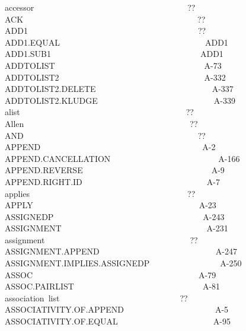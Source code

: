 \documentclass[11pt]{book}
\newenvironment{pubasis}{\begin{flushleft}\ttfamily\small}{\normalsize\rmfamily\end{flushleft}}
\begin{document}
\begin{pubasis}
accessor~~~~~~~~~~~~~~~~~~~~~~~~~~~~~~~~~~~~~??\\
ACK~~~~~~~~~~~~~~~~~~~~~~~~~~~~~~~~~~~~~~~~~~??\\
ADD1~~~~~~~~~~~~~~~~~~~~~~~~~~~~~~~~~~~~~~~~~??\\
ADD1.EQUAL~~~~~~~~~~~~~~~~~~~~~~~~~~~~~~~~~~~ADD1\\
ADD1.SUB1~~~~~~~~~~~~~~~~~~~~~~~~~~~~~~~~~~~~ADD1\\
ADDTOLIST~~~~~~~~~~~~~~~~~~~~~~~~~~~~~~~~~~~~A-73\\
ADDTOLIST2~~~~~~~~~~~~~~~~~~~~~~~~~~~~~~~~~~~A-332\\
ADD\-TO\-LIST2.DELETE~~~~~~~~~~~~~~~~~~~~~~~~~~~~A-337\\
ADD\-TO\-LIST2.KLUDGE~~~~~~~~~~~~~~~~~~~~~~~~~~~~A-339\\
alist~~~~~~~~~~~~~~~~~~~~~~~~~~~~~~~~~~~~~~~~??\\
Allen~~~~~~~~~~~~~~~~~~~~~~~~~~~~~~~~~~~~~~~~??\\
AND~~~~~~~~~~~~~~~~~~~~~~~~~~~~~~~~~~~~~~~~~~??\\
APPEND~~~~~~~~~~~~~~~~~~~~~~~~~~~~~~~~~~~~~~~A-2\\
APPEND.CAN\-CELLATION~~~~~~~~~~~~~~~~~~~~~~~~~~A-166\\
APPEND.REVERSE~~~~~~~~~~~~~~~~~~~~~~~~~~~~~~~A-9\\
APPEND.RIGHT.ID~~~~~~~~~~~~~~~~~~~~~~~~~~~~~~A-7\\
applies~~~~~~~~~~~~~~~~~~~~~~~~~~~~~~~~~~~~~~??\\
APPLY~~~~~~~~~~~~~~~~~~~~~~~~~~~~~~~~~~~~~~~~A-23\\
ASSIGNEDP~~~~~~~~~~~~~~~~~~~~~~~~~~~~~~~~~~~~A-243\\
ASSIGNMENT~~~~~~~~~~~~~~~~~~~~~~~~~~~~~~~~~~~A-231\\
assignment~~~~~~~~~~~~~~~~~~~~~~~~~~~~~~~~~~~??\\
ASSIGN\-MENT.APPEND~~~~~~~~~~~~~~~~~~~~~~~~~~~~A-247\\
ASSIGN\-MENT.IMPLIES.ASSIGNEDP~~~~~~~~~~~~~~~~~A-250\\
ASSOC~~~~~~~~~~~~~~~~~~~~~~~~~~~~~~~~~~~~~~~~A-79\\
ASSOC.PAIRLIST~~~~~~~~~~~~~~~~~~~~~~~~~~~~~~~A-81\\
association~list~~~~~~~~~~~~~~~~~~~~~~~~~~~~~??\\
ASSOC\-IATIV\-ITY.OF.APPEND~~~~~~~~~~~~~~~~~~~~~~A-5\\
ASSOC\-IATIV\-ITY.OF.EQUAL~~~~~~~~~~~~~~~~~~~~~~~A-95\\

\end{pubasis}
\end{document}
